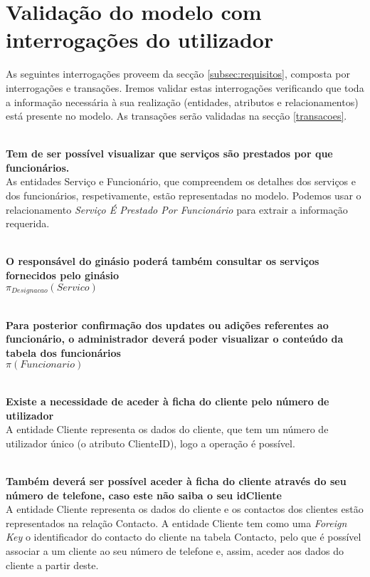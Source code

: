 \section{Validação do modelo com interrogações do utilizador}
\label{interrogacoes}

As seguintes interrogações proveem da secção \ref{subsec:requisitos}, composta por interrogações e transações. Iremos validar estas interrogações verificando que toda a informação necessária à sua realização (entidades, atributos e relacionamentos) está presente no modelo. As transações serão validadas na secção \ref{transacoes}.

\noindent
\\\textbf{Tem de ser possível visualizar que serviços são prestados por que funcionários.}
\\ As entidades Serviço e Funcionário, que compreendem os detalhes dos serviços e dos funcionários, respetivamente, estão representadas no modelo. Podemos usar o relacionamento \emph{Serviço É Prestado Por Funcionário} para extrair a informação requerida.

\noindent
\\\textbf{O responsável do ginásio poderá também consultar os serviços fornecidos pelo ginásio}
\\ $ \pi_{Designacao} (Servico) $

\noindent
\\\textbf{Para posterior confirmação dos updates ou adições referentes ao funcionário, o administrador deverá poder visualizar o conteúdo da tabela dos funcionários}
\\ $ \pi (Funcionario) $

\noindent
\\\textbf{Existe a necessidade de aceder à ficha do cliente pelo número de utilizador}
\\ A entidade Cliente representa os dados do cliente, que tem um número de utilizador único (o atributo ClienteID), logo a operação é possível.

\noindent
\\\textbf{Também deverá ser possível aceder à ficha do cliente através do seu número de telefone, caso este não saiba o seu idCliente}
\\ A entidade Cliente representa os dados do cliente e os contactos dos clientes estão representados na relação Contacto. A entidade Cliente tem como uma \emph{Foreign Key} o identificador do contacto do cliente na tabela Contacto, pelo que é possível associar a um cliente ao seu número de telefone e, assim, aceder aos dados do cliente a partir deste.

